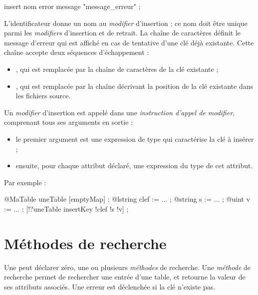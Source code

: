 \begin{galgascode}
insert nom error message "message_erreur" ;
\end{galgascode}

L'identificateur  donne un nom au \emph{modifier} d'insertion ; ce nom doit être unique parmi les \emph{modifiers} d'insertion et de retrait. La chaîne de caractères  définit le message d'erreur qui est affiché en cas de tentative d'une clé déjà existante. Cette chaîne accepte deux séquences d'échappement :
\begin{itemize}
  \item {}, qui est remplacée par la chaîne de caractères de la clé existante ;
  \item {}, qui est remplacée par la chaîne décrivant la position de la clé existante dans les fichiers source.
\end{itemize}


Un \emph{modifier} d'insertion est appelé dans une \emph{instruction d'appel de modifier}, comprenant tous ses arguments en sortie :
\begin{itemize}
  \item le premier argument est une expression de type  qui caractérise la clé à insérer ;
  \item ensuite, pour chaque attribut déclaré, une expression du type de cet attribut.
\end{itemize}

Par exemple :
\begin{galgascode}
@MaTable uneTable [emptyMap] ;
@lstring clef := ... ;
@string s := ... ;
@uint v := ... ;
[!?uneTable insertKey !clef !s !v] ;
\end{galgascode}











\section{Méthodes de recherche}

Une  peut déclarer zéro, une ou plusieurs \emph{méthodes} de recherche. Une \emph{méthode} de recherche permet de rechercher une entrée d'une table, et retourne la valeur de ses attributs associés. Une erreur est déclenchée si la clé n'existe pas.


